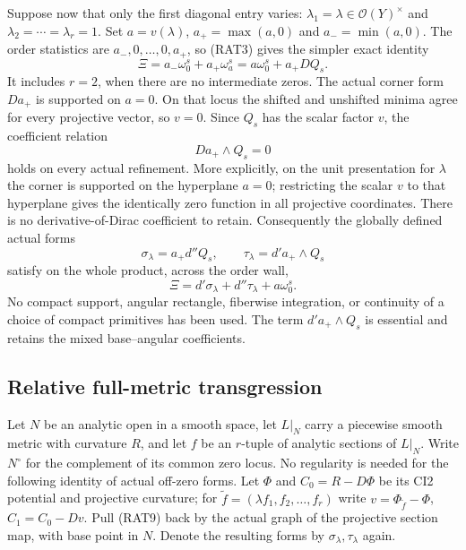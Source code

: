Suppose now that only the first diagonal entry varies:
$\lambda_1=\lambda\in\mathcal O(Y)^\times$ and
$\lambda_2=\cdots=\lambda_r=1$.  Set
$a=v(\lambda)$, $a_+=\max(a,0)$ and $a_-=\min(a,0)$.
The order statistics are $a_-,0,\ldots,0,a_+$, so (RAT3)
gives the simpler exact identity
\[
                          \Xi=a_-\omega_0^s+a_+\omega_a^s
                              =a\omega_0^s+a_+DQ_s.
 \tag{RAT7}
\]
It includes $r=2$, when there are no intermediate zeros.
The actual corner form $Da_+$ is supported on $a=0$.
On that locus the shifted and unshifted minima agree
for every projective vector, so $v=0$.  Since $Q_s$
has the scalar factor $v$, the coefficient relation
\[
                              Da_+\wedge Q_s=0
 \tag{RAT8}
\]
holds on every actual refinement.  More explicitly,
on the unit presentation for $\lambda$ the corner
is supported on the hyperplane $a=0$; restricting
the scalar $v$ to that hyperplane gives the identically
zero function in all projective coordinates.  There
is no derivative-of-Dirac coefficient to retain.
Consequently the globally defined actual forms
\[
                     \sigma_\lambda=a_+d''Q_s,
                 \qquad\tau_\lambda=d'a_+\wedge Q_s
 \tag{RAT9}
\]
satisfy on the whole product, across the order wall,
\[
                 \Xi=d'\sigma_\lambda+d''\tau_\lambda
                                                     +a\omega_0^s.
 \tag{RAT10}
\]
No compact support, angular rectangle, fiberwise integration,
or continuity of a choice of compact primitives has been used.
The term $d'a_+\wedge Q_s$ is essential and retains the
mixed base--angular coefficients.

\subsection{Relative full-metric transgression}

Let $N$ be an analytic open in a smooth space, let $L|_N$
carry a piecewise smooth metric with curvature $R$, and
let $f$ be an $r$-tuple of analytic sections of $L|_N$.
Write $N^\circ$ for the complement of its common zero
locus.  No regularity is needed for the following
identity of actual off-zero forms.  Let $\Phi$ and
$C_0=R-D\Phi$ be its CI2 potential and projective
curvature; for $\widetilde f=(\lambda f_1,f_2,\ldots,f_r)$
write $v=\Phi_{\widetilde f}-\Phi$, $C_1=C_0-Dv$.
Pull (RAT9) back by the actual graph of the projective
section map, with base point in $N$.  Denote the resulting
forms by $\sigma_\lambda,\tau_\lambda$ again.

